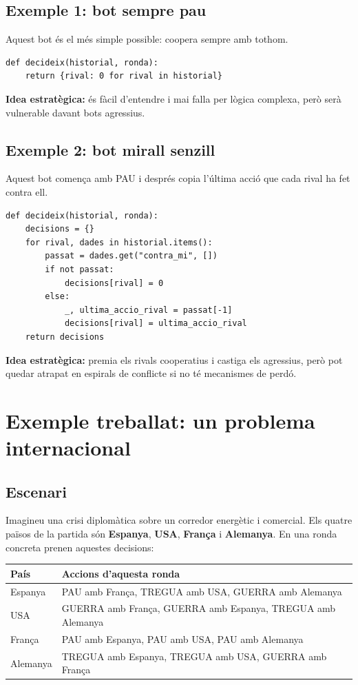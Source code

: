 \documentclass[12pt,a4paper]{report}
\begin{document}
\section{Exemple 1: bot sempre pau}

Aquest bot és el més simple possible: coopera sempre amb tothom.

\begin{verbatim}
def decideix(historial, ronda):
    return {rival: 0 for rival in historial}
\end{verbatim}

\textbf{Idea estratègica:} és fàcil d'entendre i mai falla per lògica complexa,
però serà vulnerable davant bots agressius.

\section{Exemple 2: bot mirall senzill}

Aquest bot comença amb PAU i després copia l'última acció que cada rival ha fet
contra ell.

\begin{verbatim}
def decideix(historial, ronda):
    decisions = {}
    for rival, dades in historial.items():
        passat = dades.get("contra_mi", [])
        if not passat:
            decisions[rival] = 0
        else:
            _, ultima_accio_rival = passat[-1]
            decisions[rival] = ultima_accio_rival
    return decisions
\end{verbatim}

\textbf{Idea estratègica:} premia els rivals cooperatius i castiga els agressius,
però pot quedar atrapat en espirals de conflicte si no té mecanismes de perdó.

\chapter{Exemple treballat: un problema internacional}

\section{Escenari}

Imagineu una crisi diplomàtica sobre un corredor energètic i comercial. Els quatre
països de la partida són \textbf{Espanya}, \textbf{USA}, \textbf{França} i
\textbf{Alemanya}. En una ronda concreta prenen aquestes decisions:

\begin{center}
\begin{tabularx}{\textwidth}{l Y}
\toprule
País & Accions d'aquesta ronda \\
\midrule
Espanya & PAU amb França, TREGUA amb USA, GUERRA amb Alemanya \\
USA & GUERRA amb França, GUERRA amb Espanya, TREGUA amb Alemanya \\
França & PAU amb Espanya, PAU amb USA, PAU amb Alemanya \\
Alemanya & TREGUA amb Espanya, TREGUA amb USA, GUERRA amb França \\
\bottomrule
\end{tabularx}
\end{center}
\end{document}
